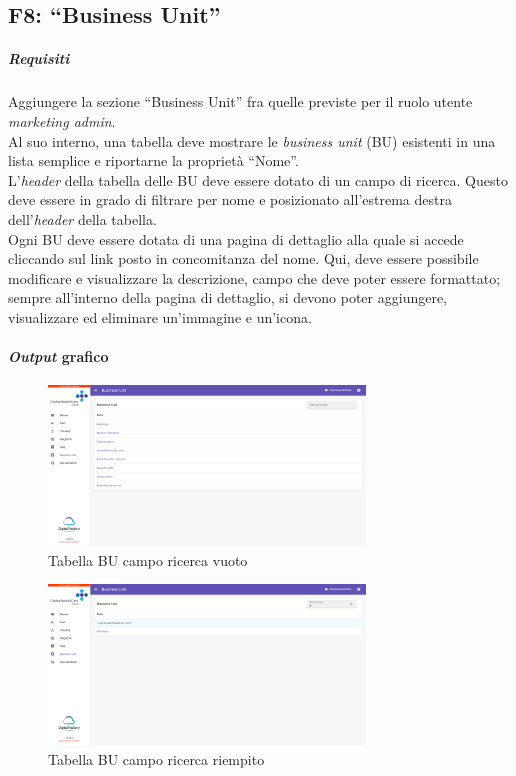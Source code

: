 \subsection{F8: “Business Unit”}
\subparagraph{Requisiti}
Aggiungere la sezione “Business Unit” fra quelle previste per il ruolo utente \textit{marketing admin}.\\
Al suo interno, una tabella deve mostrare le \textit{business unit} (BU) esistenti in una lista semplice e riportarne la proprietà “Nome”.\\
L'\textit{header} della tabella delle BU deve essere dotato di un campo di ricerca. Questo deve essere in grado di filtrare per nome e posizionato all'estrema destra dell'\textit{header} della tabella.\\
Ogni BU deve essere dotata di una pagina di dettaglio alla quale si accede cliccando sul link posto in concomitanza del nome. Qui, deve essere possibile modificare e visualizzare la descrizione, campo che deve poter essere formattato; sempre all'interno della pagina di dettaglio, si devono poter aggiungere, visualizzare ed eliminare un'immagine e un'icona.

\paragraph{\textit{Output} grafico}
\begin{figure}[H]
    \centering
    \includegraphics[width=0.75\textwidth]{images/capitolo5/f8_businessUnits/PageBusinessUnits_searchEmpty.png} 
    \caption{Tabella BU campo ricerca vuoto} 
    \label{fig:PageBusinessUnits_searchEmpty}
\end{figure}

\begin{figure}[H]
    \centering
    \includegraphics[width=0.75\textwidth]{images/capitolo5/f8_businessUnits/PageBusinessUnits_searchFilled.png} 
    \caption{Tabella BU campo ricerca riempito} 
    \label{fig:PageBusinessUnits_searchFilled}
\end{figure}


